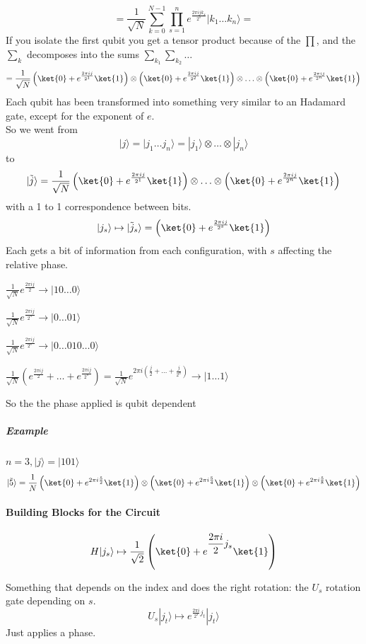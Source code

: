 \documentclass[10pt]{report}
\begin{document}
$$=\frac{1}{\sqrt{N}}\sum_{k=0}^{N-1}\prod_{s=1}^n e^{\frac{2\pi ij k_s}{2^s}}|k_1\ldots k_n\rangle =$$
If you isolate the first qubit you get a tensor product because of the $\prod$, and the $\sum_k$ decomposes into the sums $\sum_{k_1}\sum_{k_2}\ldots$
$$=\frac{1}{\sqrt{N}}\left(\ket{0}+e^{\frac{2\pi ij}{2^1}}\ket{1} \right)\otimes\left(\ket{0}+e^{\frac{2\pi ij}{2^2}}\ket{1} \right)\otimes \ldots\otimes \left(\ket{0}+e^{\frac{2\pi ij}{2^n}}\ket{1} \right)$$
Each qubit has been transformed into something very similar to an Hadamard gate, except for the exponent of $e$.\\
So we went from $$|j\rangle = |j_1\ldots j_n\rangle = |j_1\rangle\otimes\ldots\otimes|j_n\rangle$$ to $$|\tilde{j}\rangle=\frac{1}{\sqrt{N}}\left(\ket{0} + e^{\frac{2\pi ij}{2^1}}\ket{1}\right)\otimes\ldots\otimes\left(\ket{0} + e^{\frac{2\pi ij}{2^n}}\ket{1}\right)$$
with a 1 to 1 correspondence between bits.
$$|j_s\rangle\mapsto|\tilde{j}_s\rangle=\left(\ket{0} +e^{\frac{2\pi ij}{2^s}}\ket{1}\right)$$
Each gets a bit of information from each configuration, with $s$ affecting the relative phase.
\begin{list}{}{}
	\item $\frac{1}{\sqrt{N}} e^{\frac{2\pi i j}{2}} \rightarrow |10\ldots0\rangle$
	\item $\frac{1}{\sqrt{N}} e^{\frac{2\pi i j}{2^n}} \rightarrow |0\ldots01\rangle$
	\item $\frac{1}{\sqrt{N}} e^{\frac{2\pi i j}{2^s}} \rightarrow |0\ldots010\ldots0\rangle$
	\item $\frac{1}{\sqrt{N}} \left(e^{\frac{2\pi i j}{2}} +\ldots+e^{\frac{2\pi i j}{2^n}}\right) = \frac{1}{\sqrt{N}}e^{2\pi i(\frac{j}{2}+\ldots +\frac{j}{2^n})} \rightarrow |1\ldots1\rangle$
\end{list}
So the the phase applied is qubit dependent
\subparagraph{Example} $n=3, |j\rangle=|101\rangle$
$$|\tilde{5}\rangle = \frac{1}{N}\left(\ket{0} + e^{2\pi i\frac{5}{2}}\ket{1}\right)\otimes\left(\ket{0} + e^{2\pi i\frac{5}{4}}\ket{1}\right)\otimes\left(\ket{0} + e^{2\pi i\frac{5}{8}}\ket{1}\right)$$
\paragraph{Building Blocks for the Circuit}\begin{list}{}{}
	\item $$H|j_s\rangle\mapsto\frac{1}{\sqrt{2}}\left(\ket{0}+e^{\displaystyle \frac{2\pi i}{2}j_s}\ket{1}\right)$$
	\item Something that depends on the index and does the right rotation: the $U_s$ rotation gate depending on $s$.\\
	$$U_s|j_t\rangle\mapsto e^{\displaystyle \frac{2\pi i }{2^s}j_t}|j_t\rangle$$
	Just applies a phase.
	\item 
\end{list}
\end{document}
